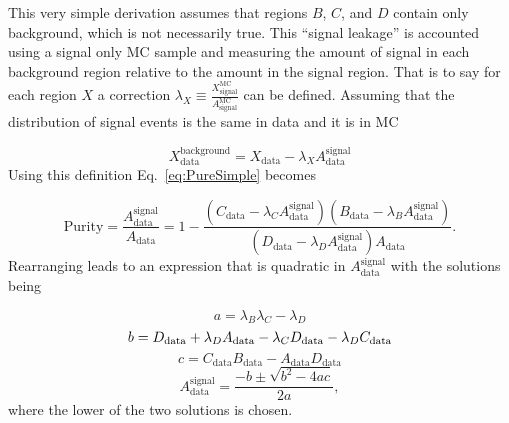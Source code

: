 This very simple derivation assumes that regions $B$, $C$, and $D$ contain only background, which is not necessarily true.  
This ``signal leakage'' is accounted using a signal only MC sample and measuring the amount of signal in each background region relative to the amount in the signal region.  
That is to say for each region $X$ a correction $\lambda_X\equiv\frac{X_{\mathrm{signal}}^{\mathrm{MC}}}{A_{\mathrm{signal}}^{\mathrm{MC}}}$ can be defined.  
Assuming that the distribution of signal events is the same in data and it is in MC

\begin{equation}
 X_{\mathrm{data}}^{\mathrm{background}} = X_{\mathrm{data}} - \lambda_XA_{\mathrm{data}}^{\mathrm{signal}}
\end{equation}
\noindent
Using this definition Eq.~\ref{eq:PureSimple} becomes

\begin{equation}
 \label{eq:PureLeakage}
 \mathrm{Purity} = \frac{A_{\mathrm{data}}^{\mathrm{signal}}}{A_{\mathrm{data}}} = 1-\frac{\left(C_{\mathrm{data}}-\lambda_CA_{\mathrm{data}}^{\mathrm{signal}}\right)\left(B_{\mathrm{data}}-\lambda_BA_{\mathrm{data}}^{\mathrm{signal}}\right)}{\left(D_{\mathrm{data}}-\lambda_DA_{\mathrm{data}}^{\mathrm{signal}}\right)A_{\mathrm{data}}}.  
\end{equation}
\noindent
Rearranging leads to an expression that is quadratic in $A_{\mathrm{data}}^{\mathrm{signal}}$ with the solutions being

\begin{equation}
 a=\lambda_B\lambda_C-\lambda_D 
\end{equation}
\begin{equation}
 b=D_{\mathrm{data}}+\lambda_DA_{\mathrm{data}}-\lambda_CD_{\mathrm{data}}-\lambda_DC_{\mathrm{data}} \\
\end{equation}
\begin{equation}
 c=C_{\mathrm{data}}B_{\mathrm{data}}-A_{\mathrm{data}}D_{\mathrm{data}}
\end{equation}
\begin{equation}
 A_{\mathrm{data}}^{\mathrm{signal}} = \frac{-b\pm\sqrt{b^2-4ac}}{2a}, 
\end{equation}
\noindent 
where the lower of the two solutions is chosen.  

